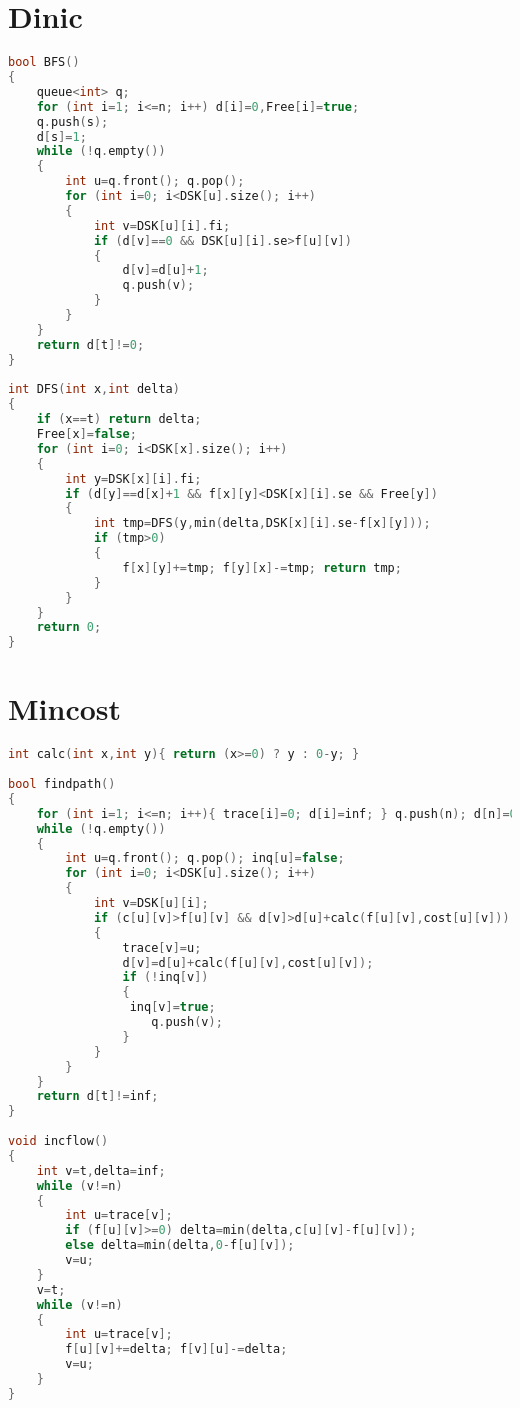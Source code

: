 \documentclass[A4 paper, 12pt]{article}
\begin{document}
	\section{Dinic}
	\begin{lstlisting}[language=C++]
bool BFS()
{
	queue<int> q;
	for (int i=1; i<=n; i++) d[i]=0,Free[i]=true;
	q.push(s);
	d[s]=1;
	while (!q.empty())
	{
    	int u=q.front(); q.pop();
    	for (int i=0; i<DSK[u].size(); i++)
    	{
        	int v=DSK[u][i].fi;
        	if (d[v]==0 && DSK[u][i].se>f[u][v])
        	{
            	d[v]=d[u]+1;
            	q.push(v);
        	}
    	}
	}
	return d[t]!=0;
}
 
int DFS(int x,int delta)
{
	if (x==t) return delta;
	Free[x]=false;
	for (int i=0; i<DSK[x].size(); i++)
	{
    	int y=DSK[x][i].fi;
    	if (d[y]==d[x]+1 && f[x][y]<DSK[x][i].se && Free[y])
    	{
        	int tmp=DFS(y,min(delta,DSK[x][i].se-f[x][y]));
        	if (tmp>0)
        	{
            	f[x][y]+=tmp; f[y][x]-=tmp; return tmp;
        	}
    	}
	}
	return 0;
}
\end{lstlisting}

	\section{Mincost}
	\begin{lstlisting}[language=C++]
int calc(int x,int y){ return (x>=0) ? y : 0-y; }
 
bool findpath()
{
	for (int i=1; i<=n; i++){ trace[i]=0; d[i]=inf; } q.push(n); d[n]=0;
	while (!q.empty())
	{
    	int u=q.front(); q.pop(); inq[u]=false;
    	for (int i=0; i<DSK[u].size(); i++)
    	{
        	int v=DSK[u][i];
        	if (c[u][v]>f[u][v] && d[v]>d[u]+calc(f[u][v],cost[u][v]))
        	{
            	trace[v]=u;
                d[v]=d[u]+calc(f[u][v],cost[u][v]);
            	if (!inq[v])
            	{
           	     inq[v]=true;
                	q.push(v);
            	}
        	}
    	}
	}
	return d[t]!=inf;
}
 
void incflow()
{
	int v=t,delta=inf;
	while (v!=n)
	{
    	int u=trace[v];
    	if (f[u][v]>=0) delta=min(delta,c[u][v]-f[u][v]);
    	else delta=min(delta,0-f[u][v]);
    	v=u;
	}
	v=t;
	while (v!=n)
	{
    	int u=trace[v];
    	f[u][v]+=delta; f[v][u]-=delta;
    	v=u;
	}
}
\end{lstlisting}
\end{document}

